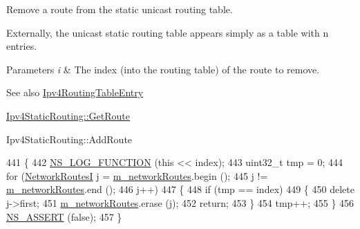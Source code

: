 Remove a route from the static unicast routing table. 

Externally, the unicast static routing table appears simply as a table with n entries.


\begin{DoxyParams}{Parameters}
{\em i} & The index (into the routing table) of the route to remove.\\
\hline
\end{DoxyParams}
\begin{DoxySeeAlso}{See also}
\hyperlink{classns3_1_1Ipv4RoutingTableEntry}{Ipv4\+Routing\+Table\+Entry} 

\hyperlink{classns3_1_1Ipv4StaticRouting_a2bd58c5ceeaff35b32a68826fbec5245}{Ipv4\+Static\+Routing\+::\+Get\+Route} 

Ipv4\+Static\+Routing\+::\+Add\+Route 
\end{DoxySeeAlso}

\begin{DoxyCode}
441 \{
442   \hyperlink{log-macros-disabled_8h_a90b90d5bad1f39cb1b64923ea94c0761}{NS\_LOG\_FUNCTION} (\textcolor{keyword}{this} << index);
443   uint32\_t tmp = 0;
444   \textcolor{keywordflow}{for} (\hyperlink{classns3_1_1Ipv4StaticRouting_a3d4f303cbea2117f36f3dd2da3ac59c9}{NetworkRoutesI} j = \hyperlink{classns3_1_1Ipv4StaticRouting_a81e0b111629b14fff2efbf69180a64c1}{m\_networkRoutes}.begin (); 
445        j != \hyperlink{classns3_1_1Ipv4StaticRouting_a81e0b111629b14fff2efbf69180a64c1}{m\_networkRoutes}.end (); 
446        j++) 
447     \{
448       \textcolor{keywordflow}{if} (tmp == index)
449         \{
450           \textcolor{keyword}{delete} j->first;
451           \hyperlink{classns3_1_1Ipv4StaticRouting_a81e0b111629b14fff2efbf69180a64c1}{m\_networkRoutes}.erase (j);
452           \textcolor{keywordflow}{return};
453         \}
454       tmp++;
455     \}
456   \hyperlink{assert_8h_a6dccdb0de9b252f60088ce281c49d052}{NS\_ASSERT} (\textcolor{keyword}{false});
457 \}
\end{DoxyCode}
